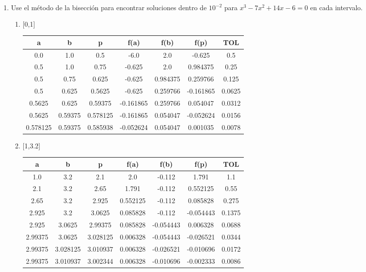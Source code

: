 \documentclass[12pt]{article}
\begin{document}
\begin{enumerate}
    \item Use el método de la bisección para encontrar soluciones dentro de \(10^{-2}\) para \(x^{3} - 7x^{2} + 14x - 6 = 0\) en cada intervalo.
    \begin{enumerate}[label=\alph*]
        \item {[0,1]}
        

            \begin{tabular}{|c|c|c|c|c|c|c|}
            \hline
            \textbf{a} & \textbf{b} & \textbf{p} & \textbf{f(a)} & \textbf{f(b)} & \textbf{f(p)} & \textbf{TOL}\\ \hline
            0.0 & 1.0 & 0.5 & -6.0 & 2.0 & -0.625 & 0.5 \\
            0.5 & 1.0 & 0.75 & -0.625 & 2.0 & 0.984375 & 0.25 \\
            0.5 & 0.75 & 0.625 & -0.625 & 0.984375 & 0.259766 & 0.125 \\
            0.5 & 0.625 & 0.5625 & -0.625 & 0.259766 & -0.161865 & 0.0625 \\
            0.5625 & 0.625 & 0.59375 & -0.161865 & 0.259766 & 0.054047 & 0.0312 \\
            0.5625 & 0.59375 & 0.578125 & -0.161865 & 0.054047 & -0.052624 & 0.0156 \\
            0.578125 & 0.59375 & 0.585938 & -0.052624 & 0.054047 & 0.001035 & 0.0078 \\
            \hline
            \end{tabular}
        \item {[1,3.2]}
        

        \begin{tabular}{|c|c|c|c|c|c|c|}
            \hline
            \textbf{a} & \textbf{b} & \textbf{p} & \textbf{f(a)} & \textbf{f(b)} & \textbf{f(p)} & \textbf{TOL}\\ \hline
            1.0 & 3.2 & 2.1 & 2.0 & -0.112 & 1.791 & 1.1 \\
            2.1 & 3.2 & 2.65 & 1.791 & -0.112 & 0.552125 & 0.55 \\
            2.65 & 3.2 & 2.925 & 0.552125 & -0.112 & 0.085828 & 0.275 \\
            2.925 & 3.2 & 3.0625 & 0.085828 & -0.112 & -0.054443 & 0.1375 \\
            2.925 & 3.0625 & 2.99375 & 0.085828 & -0.054443 & 0.006328 & 0.0688 \\
            2.99375 & 3.0625 & 3.028125 & 0.006328 & -0.054443 & -0.026521 & 0.0344 \\
            2.99375 & 3.028125 & 3.010937 & 0.006328 & -0.026521 & -0.010696 & 0.0172 \\
            2.99375 & 3.010937 & 3.002344 & 0.006328 & -0.010696 & -0.002333 & 0.0086 \\
            \hline
            \end{tabular}


\end{enumerate}
\end{enumerate}
\end{document}
